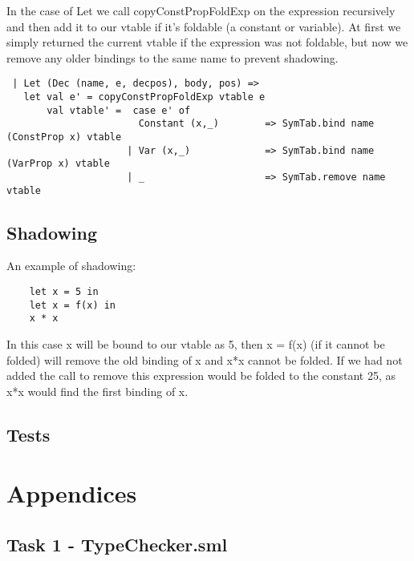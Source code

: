 \documentclass{article}
\begin{document}
\noindent In the case of Let we call copyConstPropFoldExp on the expression recursively and then add it to our vtable if it's foldable (a constant or variable). At first we simply returned the current vtable if the expression was not foldable, but now we remove any older bindings to the same name to prevent shadowing.

\begin{verbatim}
 | Let (Dec (name, e, decpos), body, pos) => 
   let val e' = copyConstPropFoldExp vtable e
       val vtable' =  case e' of
                       Constant (x,_)        => SymTab.bind name (ConstProp x) vtable 
                     | Var (x,_)             => SymTab.bind name (VarProp x) vtable
                     | _                     => SymTab.remove name vtable
\end{verbatim}

\subsection{Shadowing}
\noindent An example of shadowing:

\begin{verbatim}
    let x = 5 in
    let x = f(x) in
    x * x
\end{verbatim}

\noindent In this case x will be bound to our vtable as 5, then x = f(x) (if it cannot be folded) will remove the old binding of x and x*x cannot be folded. If we had not added the call to remove this expression would be folded to the constant 25, as x*x would find the first binding of x.

\subsection{Tests}

\section{Appendices}

\subsection{Task 1 - TypeChecker.sml}\label{app:1type}
\end{document}
